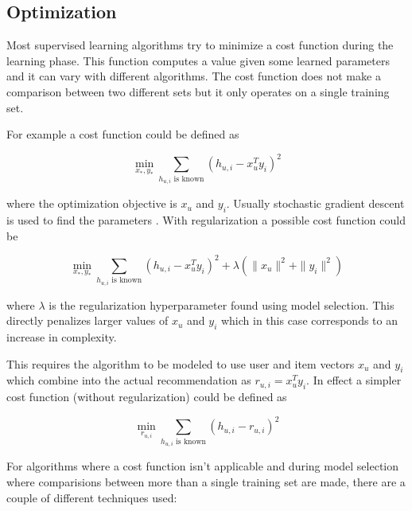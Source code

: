 
\subsection{Optimization}\label{sec:background:theory:opt}

Most supervised learning algorithms try to minimize a cost function during the learning phase. This function computes a value given some learned parameters and it can vary with different algorithms. The cost function does not make a comparison between two different sets but it only operates on a single training set.

For example a cost function could be defined as

\begin{equation}
    \min_{x_*, y_*} \sum_{h_{u,i} \text{ is known} } (h_{u, i} - x_{u}^T y_i)^2
\end{equation}

where the optimization objective is $x_u$ and $y_i$. Usually stochastic gradient descent is used to find the parameters \cite{hu2008collaborative}. With regularization a possible cost function could be

\begin{equation}
    \min_{x_*, y_*} \sum_{h_{u,i} \text{ is known} } (h_{u, i} - x_{u}^T y_i)^2 + \lambda(\|x_u\|^2 + \|y_i\|^2)
\end{equation}

where $\lambda$ is the regularization hyperparameter found using model selection. This directly penalizes larger values of $x_u$ and $y_i$ which in this case corresponds to an increase in complexity.

This requires the algorithm to be modeled to use user and item vectors $x_u$ and $y_i$ which combine into the actual recommendation as $r_{u, i} = x_u^T y_i$. In effect a simpler cost function (without regularization) could be defined as

\begin{equation}
    \min_{r_{u, i}} \sum_{h_{u,i} \text{ is known} } (h_{u, i} - r_{u, i})^2
\end{equation}


For algorithms where a cost function isn't applicable and during model selection where comparisions between more than a single training set are made, there are a couple of different techniques used:

